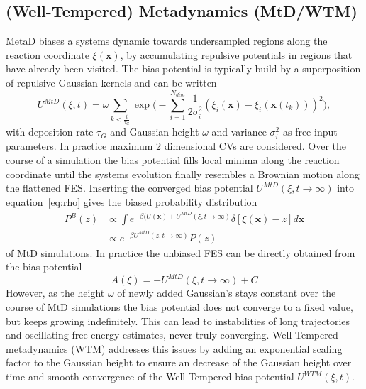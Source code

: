 \subsection{(Well-Tempered) Metadynamics (MtD/WTM)}
\label{sec:metaD}
MetaD biases a systems dynamic towards undersampled regions along the reaction coordinate $\xi(\textbf{x})$, by accumulating repulsive potentials in regions that have already been visited.\autocite{barducci2011metadynamics} The bias potential is typically build by a superposition of repulsive Gaussian kernels and can be written
\begin{equation}
  U^{MtD}(\xi,t)= \omega \sum_{k<\frac{t}{\tau_G}} \exp\biggr(-\sum_{i=1}^{N_{dim}} \frac{1}{2\sigma_{i}^{2}} (\xi_{i}(\textbf{x})-\xi_{i}(\textbf{x}(t_k)))^2 \biggl),
  \label{eq:U_mtD}
\end{equation}
with deposition rate $\tau_G$ and Gaussian height $\omega$ and variance $\sigma_i^2$ as free input parameters. In practice maximum 2 dimensional CVs are considered.
Over the course of a simulation the bias potential fills local minima along the reaction coordinate until the systems evolution finally resembles a Brownian motion along the flattened FES.
Inserting the converged bias potential $U^{MtD}(\xi,t\to\infty)$ into equation~\ref{eq:rho} gives the biased probability distribution
\begin{equation}
  \begin{split}
    P^B(z) &\propto \int e^{-\beta (U(\textbf{x})+U^{MtD}(\xi,t\to\infty)}\delta[\xi(\textbf{x})-z]d\textbf{x} \\
    &\propto e^{-\beta U^{MtD}(z,t\to\infty)} P(z)
  \end{split}
\end{equation}
of MtD simulations.
In practice the unbiased FES can be directly obtained from the bias potential
\begin{equation}
  A(\xi) = -U^{MtD}(\xi, t \to \infty) + C
\end{equation}
However, as the height $\omega$ of newly added Gaussian's stays constant over the course of MtD simulations the bias potential does not converge to a fixed value, but keeps growing indefinitely.
This can lead to instabilities of long trajectories and oscillating free energy estimates, never truly converging.
Well-Tempered metadynamics (WTM)\autocite{barducci2008well} addresses this issues by adding an exponential scaling factor to the Gaussian height to ensure an decrease of the Gaussian height over time and smooth convergence of the Well-Tempered bias potential $U^{WTM}(\xi,t)$.
